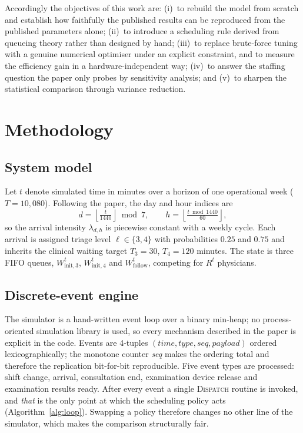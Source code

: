 \documentclass[sigconf,nonacm]{acmart}
\begin{document}
Accordingly the objectives of this work are: (i)~to rebuild the model from
scratch and establish how faithfully the published results can be reproduced
from the published parameters alone; (ii)~to introduce a scheduling rule
derived from queueing theory rather than designed by hand; (iii)~to replace
brute-force tuning with a genuine numerical optimiser under an explicit
constraint, and to measure the efficiency gain in a hardware-independent way;
(iv)~to answer the staffing question the paper only probes by sensitivity
analysis; and (v)~to sharpen the statistical comparison through variance
reduction.

\section{Methodology}

\subsection{System model}
Let $t$ denote simulated time in minutes over a horizon of one operational week
($T=10{,}080$). Following the paper, the day and hour indices are
\begin{equation}
d = \left\lfloor \tfrac{t}{1440} \right\rfloor \bmod 7,
\qquad
h = \left\lfloor \tfrac{t \bmod 1440}{60} \right\rfloor ,
\end{equation}
so the arrival intensity $\lambda_{d,h}$ is piecewise constant with a weekly
cycle. Each arrival is assigned triage level $\ell\in\{3,4\}$ with
probabilities $0.25$ and $0.75$ and inherits the clinical waiting target
$T_3=30$, $T_4=120$ minutes. The state is three FIFO queues,
$W^t_{\text{init},3}$, $W^t_{\text{init},4}$ and $W^t_{\text{follow}}$,
competing for $R^t$ physicians.

\subsection{Discrete-event engine}
The simulator is a hand-written event loop over a binary min-heap; no
process-oriented simulation library is used, so every mechanism described in
the paper is explicit in the code. Events are 4-tuples
$(\textit{time},\textit{type},\textit{seq},\textit{payload})$ ordered
lexicographically; the monotone counter \textit{seq} makes the ordering total
and therefore the replication bit-for-bit reproducible. Five event types are
processed: shift change, arrival, consultation end, examination device release
and examination results ready. After every event a single \textsc{Dispatch}
routine is invoked, and \emph{that} is the only point at which the scheduling
policy acts (Algorithm~\ref{alg:loop}). Swapping a policy therefore changes no
other line of the simulator, which makes the comparison structurally fair.
\end{document}
